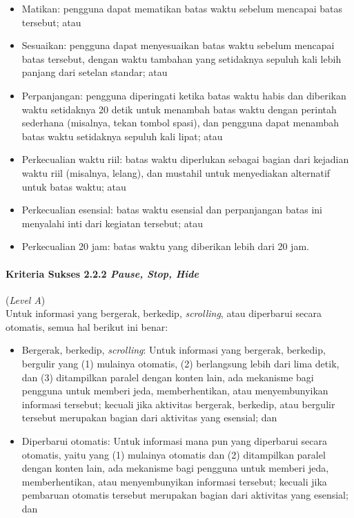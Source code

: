\begin{itemize}
	\item Matikan: pengguna dapat mematikan batas waktu sebelum mencapai batas tersebut; atau
	\item Sesuaikan: pengguna dapat menyesuaikan batas waktu sebelum mencapai batas tersebut, dengan waktu tambahan yang setidaknya sepuluh kali lebih panjang dari setelan standar; atau
	\item Perpanjangan: pengguna diperingati ketika batas waktu habis dan diberikan waktu setidaknya 20 detik untuk menambah batas waktu dengan perintah sederhana (misalnya, tekan tombol spasi), dan pengguna dapat menambah batas waktu setidaknya sepuluh kali lipat; atau
	\item Perkecualian waktu riil: batas waktu diperlukan sebagai bagian dari kejadian waktu riil (misalnya, lelang), dan mustahil untuk menyediakan alternatif untuk batas waktu; atau
	\item Perkecualian esensial: batas waktu esensial dan perpanjangan batas ini menyalahi inti dari kegiatan tersebut; atau
	\item Perkecualian 20 jam: batas waktu yang diberikan lebih dari 20 jam.
\end{itemize}

\paragraph{Kriteria Sukses 2.2.2 \textit{Pause, Stop, Hide}}
\label{subsec:kriteria_2.2.2}
(\textit{Level A}) \\

Untuk informasi yang bergerak, berkedip, \textit{scrolling}, atau diperbarui secara otomatis, semua hal berikut ini benar:

\begin{itemize}
	\item Bergerak, berkedip, \textit{scrolling}: Untuk informasi yang bergerak, berkedip, bergulir yang (1) mulainya otomatis, (2) berlangsung lebih dari lima detik, dan (3) ditampilkan paralel dengan konten lain, ada mekanisme bagi pengguna untuk memberi jeda, memberhentikan, atau menyembunyikan informasi tersebut; kecuali jika aktivitas bergerak, berkedip, atau bergulir tersebut merupakan bagian dari aktivitas yang esensial; dan
	\item Diperbarui otomatis: Untuk informasi mana pun yang diperbarui secara otomatis, yaitu yang (1) mulainya otomatis dan (2) ditampilkan paralel dengan konten lain, ada mekanisme bagi pengguna untuk memberi jeda, memberhentikan, atau menyembunyikan informasi tersebut; kecuali jika pembaruan otomatis tersebut merupakan bagian dari aktivitas yang esensial; dan
\end{itemize}

